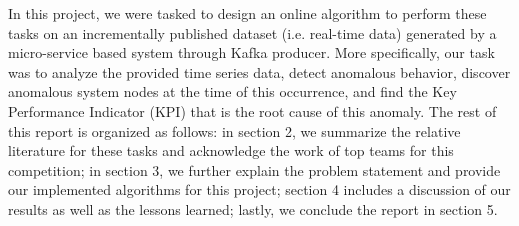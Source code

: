 \documentclass[12pt]{article}
\begin{document}
\noindent In this project, we were tasked to design an online algorithm to perform these tasks on an incrementally published dataset (i.e. real-time data) generated by a micro-service based system through Kafka producer. More specifically, our task was to analyze the provided time series data, detect anomalous behavior, discover anomalous system nodes at the time of this occurrence, and find the Key Performance Indicator (KPI) that is the root cause of this anomaly. The rest of this report is organized as follows: in section 2, we summarize the relative literature for these tasks and acknowledge the work of top teams for this competition; in section 3, we further explain the problem statement and provide our implemented algorithms for this project; section 4 includes a discussion of our results as well as the lessons learned; lastly, we conclude the report in section 5. 
\end{document}
